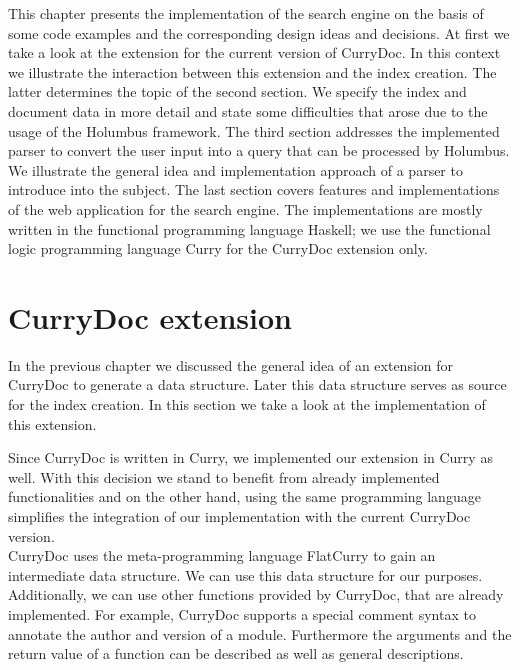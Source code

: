 \documentclass[%
	pdftex,%
	a4paper,%
	oneside,%
	chapterprefix,%
	headsepline,%
	12pt%
]{scrbook}
\begin{document}
This chapter presents the implementation of the search engine on the
basis of some code examples and the corresponding design ideas and
decisions. At first we take a look at the extension for the current
version of CurryDoc. In this context we illustrate the interaction
between this extension and the index creation. The latter determines
the topic of the second section. We specify the index and document
data in more detail and state some difficulties that arose due to the
usage of the Holumbus framework. The third section addresses the
implemented parser to convert the user input into a query that can be
processed by Holumbus. We illustrate the general idea and
implementation approach of a parser to introduce into the subject. The
last section covers features and implementations of the web
application for the search engine.  The implementations are mostly
written in the functional programming language Haskell; we use the
functional logic programming language Curry for the CurryDoc
extension only.\\


\section{CurryDoc extension}\label{implementation:currydoc}

In the previous chapter we discussed the general idea of an extension
for CurryDoc to generate a data structure. Later this data structure serves
as source for the index creation. In this section we take a look at
the implementation of this extension.

Since CurryDoc is written in Curry, we implemented our extension in
Curry as well. With this decision we stand to benefit from already
implemented functionalities and on the other hand, using the same
programming language simplifies the integration of our
implementation with the current CurryDoc version.\\

CurryDoc uses the meta-programming language FlatCurry to gain an
intermediate data structure. We can use this data structure for our
purposes. Additionally, we can use other functions provided by
CurryDoc, that are already implemented. For example, CurryDoc supports
a special comment syntax to annotate the author and version of a
module. Furthermore the arguments and the return value of a function
can be described as well as general descriptions.
\end{document}
